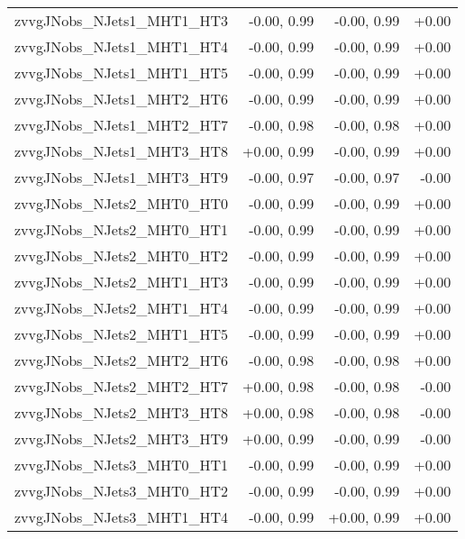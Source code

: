 \begin{tabular}{|l|r|r|r|}
zvvgJNobs\_NJets1\_MHT1\_HT3             &      -0.00, 0.99 &     -0.00, 0.99 &  +0.00 \\
zvvgJNobs\_NJets1\_MHT1\_HT4             &      -0.00, 0.99 &     -0.00, 0.99 &  +0.00 \\
zvvgJNobs\_NJets1\_MHT1\_HT5             &      -0.00, 0.99 &     -0.00, 0.99 &  +0.00 \\
zvvgJNobs\_NJets1\_MHT2\_HT6             &      -0.00, 0.99 &     -0.00, 0.99 &  +0.00 \\
zvvgJNobs\_NJets1\_MHT2\_HT7             &      -0.00, 0.98 &     -0.00, 0.98 &  +0.00 \\
zvvgJNobs\_NJets1\_MHT3\_HT8             &      +0.00, 0.99 &     -0.00, 0.99 &  +0.00 \\
zvvgJNobs\_NJets1\_MHT3\_HT9             &      -0.00, 0.97 &     -0.00, 0.97 &  -0.00 \\
zvvgJNobs\_NJets2\_MHT0\_HT0             &      -0.00, 0.99 &     -0.00, 0.99 &  +0.00 \\
zvvgJNobs\_NJets2\_MHT0\_HT1             &      -0.00, 0.99 &     -0.00, 0.99 &  +0.00 \\
zvvgJNobs\_NJets2\_MHT0\_HT2             &      -0.00, 0.99 &     -0.00, 0.99 &  +0.00 \\
zvvgJNobs\_NJets2\_MHT1\_HT3             &      -0.00, 0.99 &     -0.00, 0.99 &  +0.00 \\
zvvgJNobs\_NJets2\_MHT1\_HT4             &      -0.00, 0.99 &     -0.00, 0.99 &  +0.00 \\
zvvgJNobs\_NJets2\_MHT1\_HT5             &      -0.00, 0.99 &     -0.00, 0.99 &  +0.00 \\
zvvgJNobs\_NJets2\_MHT2\_HT6             &      -0.00, 0.98 &     -0.00, 0.98 &  +0.00 \\
zvvgJNobs\_NJets2\_MHT2\_HT7             &      +0.00, 0.98 &     -0.00, 0.98 &  -0.00 \\
zvvgJNobs\_NJets2\_MHT3\_HT8             &      +0.00, 0.98 &     -0.00, 0.98 &  -0.00 \\
zvvgJNobs\_NJets2\_MHT3\_HT9             &      +0.00, 0.99 &     -0.00, 0.99 &  -0.00 \\
zvvgJNobs\_NJets3\_MHT0\_HT1             &      -0.00, 0.99 &     -0.00, 0.99 &  +0.00 \\
zvvgJNobs\_NJets3\_MHT0\_HT2             &      -0.00, 0.99 &     -0.00, 0.99 &  +0.00 \\
zvvgJNobs\_NJets3\_MHT1\_HT4             &      -0.00, 0.99 &     +0.00, 0.99 &  +0.00 \\

\end{tabular}
